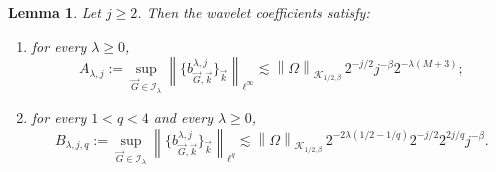 \documentclass[11pt]{amsart}
\newtheorem{lemma}[definition]{Lemma}
\theoremstyle{remark}
\numberwithin{equation}{section}
\newcommand{\cK}{\mathcal K}
\newcommand{\cI}{\mathcal I}
\newcommand{\norm}[1]{\left\lVert #1\right\rVert}
\begin{document}
	\begin{lemma}\label{lem:coeff-bounds}
		Let \(j\ge2\). Then the wavelet coefficients satisfy:
		\begin{enumerate}
			\item for every \(\lambda\ge0\),
			\begin{equation}\label{eq:A-lambda-j}
				A_{\lambda,j}:=\sup_{\vec G\in\cI_\lambda}\norm{\{b_{\vec G,\vec k}^{\lambda,j}\}_{\vec k}}_{\ell^\infty}
				\lesssim
				\norm{\Omega}_{\cK_{1/2,\beta}}
				\,2^{-j/2}j^{-\beta}2^{-\lambda(M+3)};
			\end{equation}
			\item for every \(1<q<4\) and every \(\lambda\ge0\),
			\begin{equation}\label{eq:B-lambda-j}
				B_{\lambda,j,q}:=\sup_{\vec G\in\cI_\lambda}\norm{\{b_{\vec G,\vec k}^{\lambda,j}\}_{\vec k}}_{\ell^q}
				\lesssim
				\norm{\Omega}_{\cK_{1/2,\beta}}
				\,2^{-2\lambda(1/2-1/q)}2^{-j/2}2^{2j/q}j^{-\beta}.
			\end{equation}
		\end{enumerate}
	\end{lemma}
	
\end{document}

